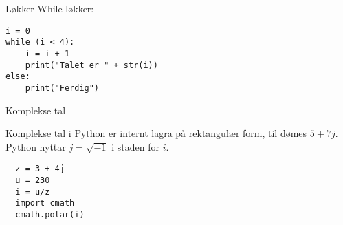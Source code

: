 \begin{frame}[containsverbatim]{Løkker}
	While-løkker:
	
\begin{verbatim}
i = 0
while (i < 4):
	i = i + 1
	print("Talet er " + str(i))
else:
	print("Ferdig")
\end{verbatim}
	
\end{frame}

\begin{frame}[containsverbatim]{Komplekse tal}

  Komplekse tal i Python er internt lagra på rektangulær form, til dømes \(5 + 7j\). Python nyttar \(j = \sqrt{-1}\) i staden for \(i\).

\begin{verbatim}
  z = 3 + 4j
  u = 230
  i = u/z
  import cmath
  cmath.polar(i)
\end{verbatim}
  
\end{frame}
